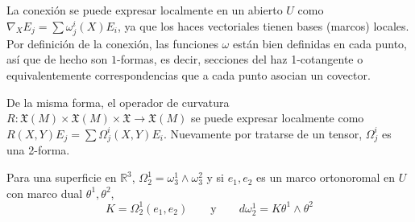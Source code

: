 \documentclass[spanish]{article}
\theoremstyle{definition}
\newcommand{\R}{\mathbb{R}}
\newcommand{\X}{\mathfrak{X}}
\begin{document}
	La conexión se puede expresar localmente en un abierto $U$ como $\nabla_XE_j=\sum\omega_j^i(X)E_i$, ya que los haces vectoriales tienen bases (marcos) locales. Por definición de la conexión, las funciones $\omega$ están bien definidas en cada punto, así que de hecho son $1$-formas, es decir, secciones del haz 1-cotangente o equivalentemente correspondencias que a cada punto asocian un covector.
	
	De la misma forma, el operador de curvatura $R:\X(M)\times\X(M)\times\X\to\X(M)$ se puede expresar localmente como $R(X,Y)E_j=\sum\Omega_j^i(X,Y)E_i$. Nuevamente por tratarse de un tensor, $\Omega_j^i$ es una 2-forma.
	
	Para una superficie en $\R^3$, $\Omega_2^1=\omega_3^1\wedge\omega_3^2$ y si $e_1,e_2$ es un marco ortonoromal en $U$ con marco dual $\theta^1,\theta^2$,
	\[K=\Omega_2^1(e_1,e_2)\qquad\text{y}\qquad d\omega_2^1=K\theta^1\wedge\theta^2\]
	\fi
\end{document}
